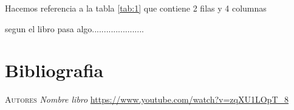 \documentclass[12pt, letterpaper]{article} %
\begin{document}
	Hacemos referencia a la tabla \ref{tab:1} que contiene 2 filas y 4 columnas
	
	segun el libro \cite{bib:item1} pasa algo......................
	\section{Bibliografia}\label{sec:Bibliografia}
	
		\begin{thebibliography}{20}
			
			 \textsc{Autores} \textit{Nombre libro}
			 \url{https://www.youtube.com/watch?v=zqXU1LOpT_8}

		\end{thebibliography}
	 
\end{document}
